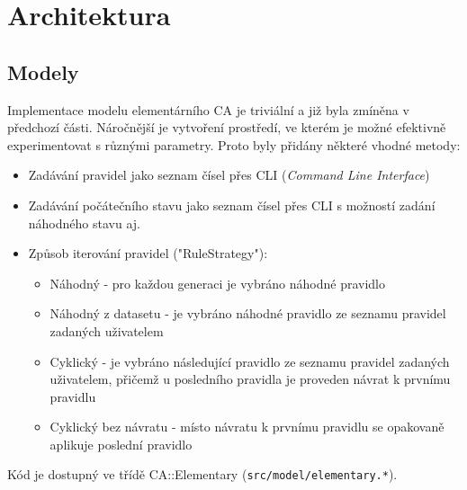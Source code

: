 \section{Architektura}

\subsection{Modely}
Implementace modelu elementárního CA je triviální a již byla zmíněna v předchozí
části.
Náročnější je vytvoření prostředí, ve kterém je možné efektivně experimentovat
s různými parametry. Proto byly přidány některé vhodné metody:

\begin{itemize}
	\item Zadávání pravidel jako seznam čísel přes CLI (\textit{Command Line Interface})
	\item Zadávání počátečního stavu jako seznam čísel přes CLI s možností
	zadání náhodného stavu aj.
	\item Způsob iterování pravidel ("RuleStrategy"):
	\begin{itemize}
		\item Náhodný - pro každou generaci je vybráno náhodné pravidlo
		\item Náhodný z datasetu - je vybráno náhodné pravidlo ze seznamu
		pravidel zadaných uživatelem
		\item Cyklický - je vybráno následující pravidlo ze seznamu pravidel
		zadaných uživatelem, přičemž u posledního pravidla
		je proveden návrat k prvnímu pravidlu
		\item Cyklický bez návratu - místo návratu k prvnímu pravidlu se
		opakovaně aplikuje poslední pravidlo
	\end{itemize}
\end{itemize}

Kód je dostupný ve třídě CA::Elementary (\verb|src/model/elementary.*|).


